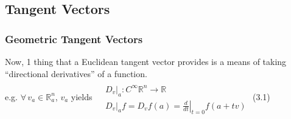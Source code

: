%                                               
%                                                              
%


\subsection*{Tangent Vectors}



\subsubsection*{Geometric Tangent Vectors}

Now, 1 thing that a Euclidean tangent vector provides is a means of taking ``directional derivatives'' of a function. \\
e.g. $\forall \, v_a \in \mathbb{R}^n_a$, $v_a$ yields $\begin{aligned} & \quad \\ 
  & \left. D_v \right|_a : C^{\infty}\mathbb{R}^n \to \mathbb{R} \\ 
  & \left. D_v \right|_a f  =   D_v f(a) = \left. \frac{d}{dt} \right|_{t=0}f(a+tv) \end{aligned}$ (3.1)

